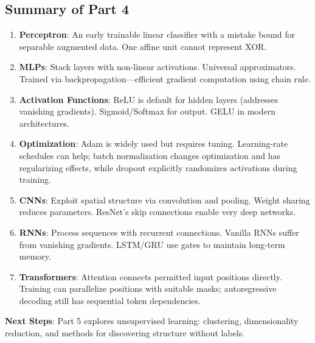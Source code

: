 \documentclass[11pt,twoside]{article}
\numberwithin{equation}{section}
\theoremstyle{plain}
\theoremstyle{definition}
\theoremstyle{remark}
\begin{document}
\subsection{Summary of Part 4}

\begin{tcolorbox}[colback=yellow!10!white,colframe=orange!75!black,title=Key Takeaways]
\begin{enumerate}
\item \textbf{Perceptron}: An early trainable linear classifier with a mistake bound for separable augmented data. One affine unit cannot represent XOR.

\item \textbf{MLPs}: Stack layers with non-linear activations. Universal approximators. Trained via backpropagation---efficient gradient computation using chain rule.

\item \textbf{Activation Functions}: ReLU is default for hidden layers (addresses vanishing gradients). Sigmoid/Softmax for output. GELU in modern architectures.

\item \textbf{Optimization}: Adam is widely used but requires tuning. Learning-rate schedules can help; batch normalization changes optimization and has regularizing effects, while dropout explicitly randomizes activations during training.

\item \textbf{CNNs}: Exploit spatial structure via convolution and pooling. Weight sharing reduces parameters. ResNet's skip connections enable very deep networks.

\item \textbf{RNNs}: Process sequences with recurrent connections. Vanilla RNNs suffer from vanishing gradients. LSTM/GRU use gates to maintain long-term memory.

\item \textbf{Transformers}: Attention connects permitted input positions directly. Training can parallelize positions with suitable masks; autoregressive decoding still has sequential token dependencies.
\end{enumerate}

\textbf{Next Steps}: Part 5 explores unsupervised learning: clustering, dimensionality reduction, and methods for discovering structure without labels.
\end{tcolorbox}
\end{document}
